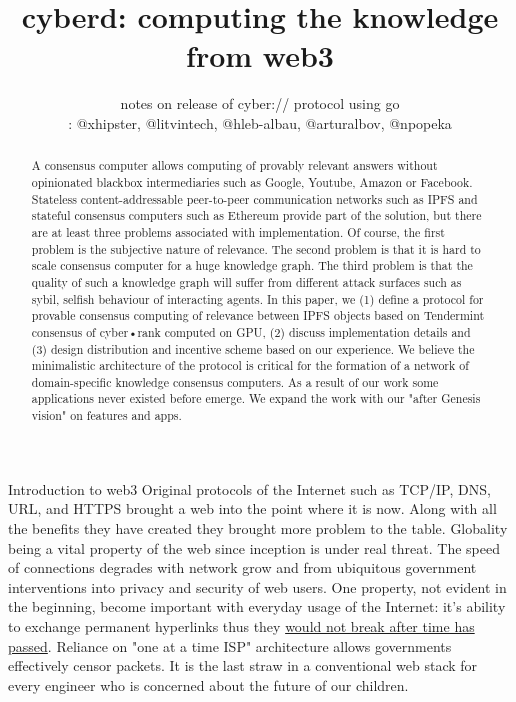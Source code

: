 \documentclass[10pt,oneside]{amsart}
\title{\MakeLowercase{cyberd: Computing the knowledge from web3}}
\author{
    \MakeLowercase{\uppercase{N}otes on \linkred{https://github.com/cybercongress/cyberd/releases/tag/v0.1.0}{cyber} release of cyber:// protocol \linkred{https://github.com/cybercongress/cyberd}{reference implementation} using Go\\
    \linkred{https://cybercongress.ai/}{cyber•\uppercase{C}ongress}: @xhipster, @litvintech, @hleb-albau, @arturalbov, @npopeka}
  }
\makeatletter
\def\section{\@startsection{section}{1}%
  \z@{.7\linespacing\@plus\linespacing}{.5\linespacing}%
  {\normalfont\scshape}}%
\makeatother
\begin{document}
\justify
\maketitle

\begin{abstract}
    A consensus computer allows computing of provably relevant answers without opinionated blackbox intermediaries such as Google, Youtube, Amazon or Facebook.
     Stateless content-addressable peer-to-peer communication networks such as IPFS and stateful consensus computers such as Ethereum provide part of the solution,
      but there are at least three problems associated with implementation. Of course, the first problem is the subjective nature of relevance. The second problem is that it is hard to scale consensus computer
       for a huge knowledge graph. The third problem is that the quality of such a knowledge graph will suffer from different attack surfaces such as sybil, selfish behaviour of interacting agents. In this paper, we (1) define a protocol for provable
        consensus computing of relevance between IPFS objects based on Tendermint consensus of cyber•rank computed on GPU, (2) discuss implementation details and (3) design distribution and incentive scheme based on our experience. We believe the minimalistic architecture of the protocol
         is critical for the formation of a network of domain-specific knowledge consensus computers. As a result of our work some applications never existed before emerge. We expand the work with our "after Genesis vision" on features and apps.
\end{abstract}

\section{Introduction to web3}\label{introduction to web3}
Original protocols of the Internet such as TCP/IP, DNS, URL, and HTTPS brought a web into the point where it is now. Along with all the benefits they have created 
they brought more problem to the table. Globality being
 a vital property of the web since inception is under real threat. The speed of connections degrades with network grow and from ubiquitous government interventions into privacy and
  security of web users. One property, not evident in the beginning, become important with everyday usage of the Internet: it's ability to exchange permanent hyperlinks 
  thus they
  \href{https://ipfs.io/ipfs/QmNhaUrhM7KcWzFYdBeyskoNyihrpHvUEBQnaddwPZigcN}{would not break after time has passed}.
 Reliance on "one at a time ISP" architecture allows governments effectively censor packets. It is the last straw in a conventional web stack for every engineer who is concerned about the future of our children.\\
 
\end{document}
